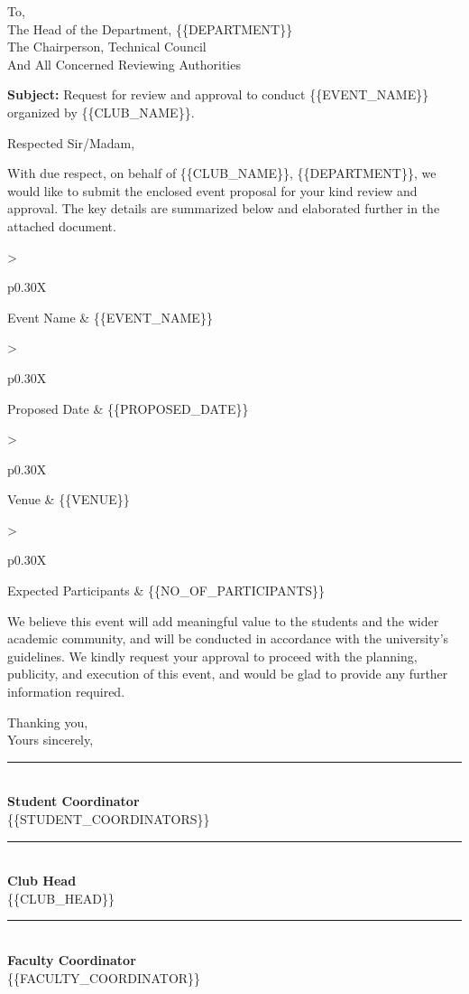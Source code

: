 \documentclass[12pt,a4paper]{article}
\newcommand{\PH}[1]{{\ttfamily\small\{\{#1\}\}}}
\newcommand{\ClubName}{\PH{CLUB_NAME}}
\newcommand{\DepartmentName}{\PH{DEPARTMENT}}
\newcommand{\PreparedDate}{\PH{DATE}}
\newcommand{\EventName}{\PH{EVENT_NAME}}
\newcommand{\ProposedDate}{\PH{PROPOSED_DATE}}
\newcommand{\Venue}{\PH{VENUE}}
\newcommand{\ExpectedParticipants}{\PH{NO_OF_PARTICIPANTS}}
\newcommand{\SectionBox}[1]{%
\begin{tcolorbox}[colback=JainFill,colframe=JainBlue,boxrule=0.8pt,arc=1mm,left=6pt,right=6pt,top=5pt,bottom=5pt]
#1
\end{tcolorbox}
}
\newcommand{\InfoRow}[2]{%
\begin{tabularx}{\textwidth}{>{\bfseries\raggedright\arraybackslash}p{0.30\textwidth}X}
#1 & #2
\end{tabularx}\par
}
\newcommand{\SignatureBlock}[2]{%
\begin{minipage}[t]{0.31\textwidth}
\vspace{0.2cm}
\centering
\rule{0.9\linewidth}{0.6pt}\\[4pt]
\textbf{#1}\\
#2
\end{minipage}
}
\begin{document}

\vspace*{0.2cm}
\noindent \PreparedDate \hfill

\vspace{0.3cm}

\noindent
To,\\[3pt]
The Head of the Department, \DepartmentName\\
The Chairperson, Technical Council\\
And All Concerned Reviewing Authorities

\vspace{0.3cm}

\noindent \textbf{Subject: } Request for review and approval to conduct \EventName{} organized by \ClubName.

\vspace{0.3cm}

\noindent Respected Sir/Madam,

\vspace{0.25cm}

\noindent
With due respect, on behalf of \ClubName, \DepartmentName, we would like to submit the enclosed event proposal for your kind review and approval. The key details are summarized below and elaborated further in the attached document.

\vspace{0.3cm}

\SectionBox{
\InfoRow{Event Name}{\EventName}
\InfoRow{Proposed Date}{\ProposedDate}
\InfoRow{Venue}{\Venue}
\InfoRow{Expected Participants}{\ExpectedParticipants}
}

\vspace{0.3cm}

\noindent
We believe this event will add meaningful value to the students and the wider academic community, and will be conducted in accordance with the university's guidelines. We kindly request your approval to proceed with the planning, publicity, and execution of this event, and would be glad to provide any further information required.

\vspace{0.4cm}

\noindent Thanking you,\\
\noindent Yours sincerely,

\vspace{1.4cm}

\noindent
\SignatureBlock{Student Coordinator}{\PH{STUDENT_COORDINATORS}}
\hfill
\SignatureBlock{Club Head}{\PH{CLUB_HEAD}}
\hfill
\SignatureBlock{Faculty Coordinator}{\PH{FACULTY_COORDINATOR}}
\end{document}
